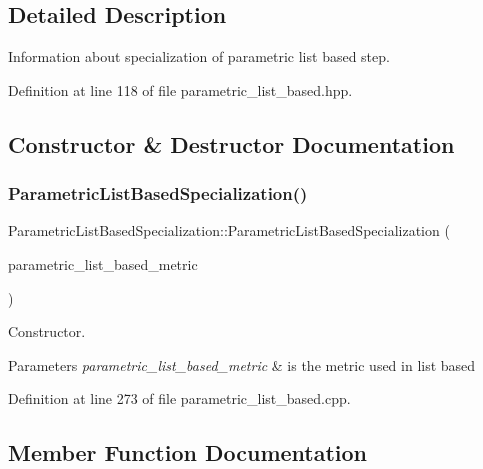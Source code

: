 \subsection{Detailed Description}
Information about specialization of parametric list based step. 

Definition at line 118 of file parametric\+\_\+list\+\_\+based.\+hpp.



\subsection{Constructor \& Destructor Documentation}
\mbox{\label{classParametricListBasedSpecialization_aa5aace9795b539ffc54c82d656c82ed6}} 
\subsubsection{\texorpdfstring{Parametric\+List\+Based\+Specialization()}{ParametricListBasedSpecialization()}}
{\footnotesize\ttfamily Parametric\+List\+Based\+Specialization\+::\+Parametric\+List\+Based\+Specialization (\begin{DoxyParamCaption}\item[{const \hyperlink{parametric__list__based_8hpp_af0e38be9a93de210a888144f6a52e498}{Parametric\+List\+Based\+\_\+\+Metric}}]{parametric\+\_\+list\+\_\+based\+\_\+metric }\end{DoxyParamCaption})\hspace{0.3cm}{\ttfamily [explicit]}}



Constructor. 


\begin{DoxyParams}{Parameters}
{\em parametric\+\_\+list\+\_\+based\+\_\+metric} & is the metric used in list based \\
\hline
\end{DoxyParams}


Definition at line 273 of file parametric\+\_\+list\+\_\+based.\+cpp.



\subsection{Member Function Documentation}
\mbox{\label{classParametricListBasedSpecialization_a713bf4dc25984627ab7e0803f91510c2}} 
